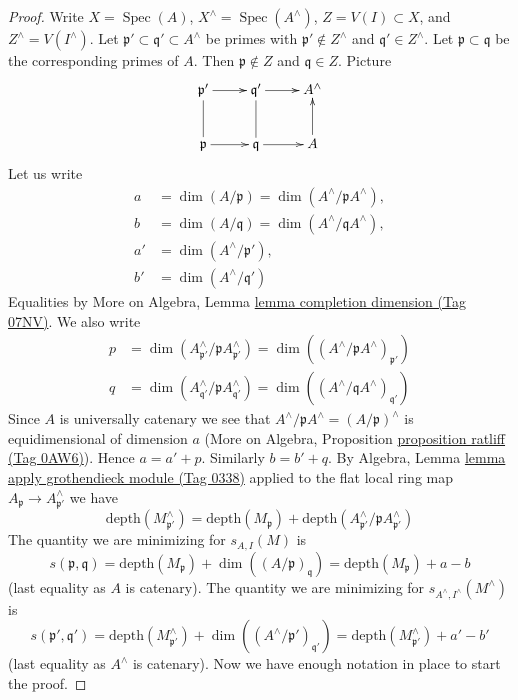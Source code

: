 \documentclass{amsart}
\theoremstyle{plain}
\theoremstyle{definition}
\theoremstyle{remark}
\numberwithin{equation}{subsection}
\def\Spec{\mathop{\mathrm{Spec}}}
\begin{document}
\begin{proof}
Write $X = \Spec(A)$, $X^\wedge = \Spec(A^\wedge)$, $Z = V(I) \subset X$, and
$Z^\wedge = V(I^\wedge)$.
Let $\mathfrak p' \subset \mathfrak q' \subset A^\wedge$
be primes with $\mathfrak p' \not \in Z^\wedge$ and
$\mathfrak q' \in Z^\wedge$. Let $\mathfrak p \subset \mathfrak q$
be the corresponding primes of $A$. Then $\mathfrak p \not \in Z$
and $\mathfrak q \in Z$. Picture
$$
\xymatrix{
\mathfrak p' \ar[r] & \mathfrak q' \ar[r] & A^\wedge \\
\mathfrak p \ar[r] \ar@{-}[u] &
\mathfrak q \ar[r] \ar@{-}[u] & A \ar[u]
}
$$
Let us write
\begin{align*}
a & = \dim(A/\mathfrak p) = \dim(A^\wedge/\mathfrak pA^\wedge),\\
b & = \dim(A/\mathfrak q) = \dim(A^\wedge/\mathfrak qA^\wedge),\\
a' & = \dim(A^\wedge/\mathfrak p'),\\
b' & = \dim(A^\wedge/\mathfrak q')
\end{align*}
Equalities by
More on Algebra, Lemma \href{https://stacks.math.columbia.edu/tag/07NV}{lemma completion dimension (Tag 07NV)}.
We also write
\begin{align*}
p & = \dim(A^\wedge_{\mathfrak p'}/\mathfrak p A^\wedge_{\mathfrak p'}) =
\dim((A^\wedge/\mathfrak p A^\wedge)_{\mathfrak p'}) \\
q & = \dim(A^\wedge_{\mathfrak q'}/\mathfrak p A^\wedge_{\mathfrak q'}) =
\dim((A^\wedge/\mathfrak q A^\wedge)_{\mathfrak q'})
\end{align*}
Since $A$ is universally catenary we see that
$A^\wedge/\mathfrak pA^\wedge = (A/\mathfrak p)^\wedge$
is equidimensional of dimension $a$
(More on Algebra, Proposition \href{https://stacks.math.columbia.edu/tag/0AW6}{proposition ratliff (Tag 0AW6)}).
Hence $a = a' + p$. Similarly $b = b' + q$.
By Algebra, Lemma \href{https://stacks.math.columbia.edu/tag/0338}{lemma apply grothendieck module (Tag 0338)}
applied to the flat local ring map
$A_\mathfrak p \to A^\wedge_{\mathfrak p'}$
we have
$$
\text{depth}(M^\wedge_{\mathfrak p'})
=
\text{depth}(M_\mathfrak p) +
\text{depth}(A^\wedge_{\mathfrak p'} / \mathfrak p A^\wedge_{\mathfrak p'})
$$
The quantity we are minimizing for $s_{A, I}(M)$ is
$$
s(\mathfrak p, \mathfrak q) =
\text{depth}(M_\mathfrak p) + \dim((A/\mathfrak p)_\mathfrak q) =
\text{depth}(M_\mathfrak p) + a - b
$$
(last equality as $A$ is catenary). The quantity we are minimizing
for $s_{A^\wedge, I^\wedge}(M^\wedge)$
is
$$
s(\mathfrak p', \mathfrak q') =
\text{depth}(M^\wedge_{\mathfrak p'}) +
\dim((A^\wedge/\mathfrak p')_{\mathfrak q'}) =
\text{depth}(M^\wedge_{\mathfrak p'}) + a' - b'
$$
(last equality as $A^\wedge$ is catenary).
Now we have enough notation in place to start the proof.


\end{proof}
\end{document}
